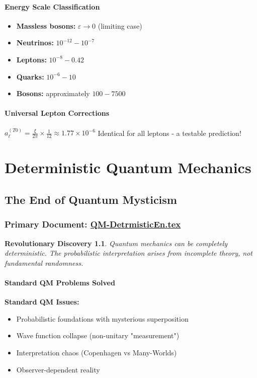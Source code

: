 \documentclass[12pt,a4paper]{report}
\newtheorem{discovery}{Revolutionary Discovery}[chapter]
\begin{document}
	\subsubsection{Energy Scale Classification}
	\begin{itemize}
		\item \textbf{Massless bosons:} $\varepsilon \rightarrow 0$ (limiting case)
		\item \textbf{Neutrinos:} $10^{-12} - 10^{-7}$
		\item \textbf{Leptons:} $10^{-8} - 0.42$
		\item \textbf{Quarks:} $10^{-6} - 10$
		\item \textbf{Bosons:} approximately $100 - 7500$
	\end{itemize}
	
	\subsubsection{Universal Lepton Corrections}
	$a_\ell^{(T0)} = \frac{\xi}{2\pi} \times \frac{1}{12} \approx 1.77 \times 10^{-6}$
	Identical for all leptons - a testable prediction!
	
	\chapter{Deterministic Quantum Mechanics}
	
	\section{The End of Quantum Mysticism}
	\subsection{Primary Document: \href{https://github.com/jpascher/T0-Time-Mass-Duality/tree/main/2/pdf/QM-DetrmisticEn.pdf}{QM-DetrmisticEn.tex}}
	
	\begin{discovery}
		Quantum mechanics can be completely deterministic. The probabilistic interpretation arises from incomplete theory, not fundamental randomness.
	\end{discovery}
	
	\subsubsection{Standard QM Problems Solved}
	\textbf{Standard QM Issues:}
	\begin{itemize}
		\item Probabilistic foundations with mysterious superposition
		\item Wave function collapse (non-unitary "measurement")
		\item Interpretation chaos (Copenhagen vs Many-Worlds)
		\item Observer-dependent reality
	\end{itemize}
	
\end{document}
